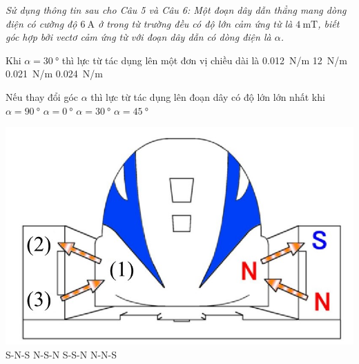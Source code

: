 \textit{Sử dụng thông tin sau cho Câu 5 và Câu 6: Một đoạn dây dẫn thẳng mang dòng điện có cường độ $\SI{6}{\ampere}$ ở trong từ trường đều có độ lớn cảm ứng từ là $\SI{4}{\milli\tesla}$, biết góc hợp bởi vectơ cảm ứng từ với đoạn dây dẫn có dòng điện là $\alpha$.}
\begin{ex}
	Khi $\alpha=\SI{30}{\degree}$ thì lực từ tác dụng lên một đơn vị chiều dài là
	\choice
	{\SI{0.012}{\newton/\meter}}
	{\SI{12}{\newton/\meter}}
	{\SI{0.021}{\newton/\meter}}
	{\SI{0.024}{\newton/\meter}}
	\loigiai{}
\end{ex}
\begin{ex}
	Nếu thay đổi góc $\alpha$ thì lực từ tác dụng lên đoạn dây có độ lớn lớn nhất khi
	\choice
	{$\alpha=\SI{90}{\degree}$}
	{$\alpha=\SI{0}{\degree}$}
	{$\alpha=\SI{30}{\degree}$}
	{$\alpha=\SI{45}{\degree}$}
	\loigiai{}
\end{ex}
\begin{ex}
	{\vspace{-0.5cm}\includegraphics[scale=0.4]{../figs/FINAL-SEM1-004-1}}
	\choice
	{S-N-S}
	{N-S-N}
	{S-S-N}
	{N-N-S}
	\loigiai{}
\end{ex}
